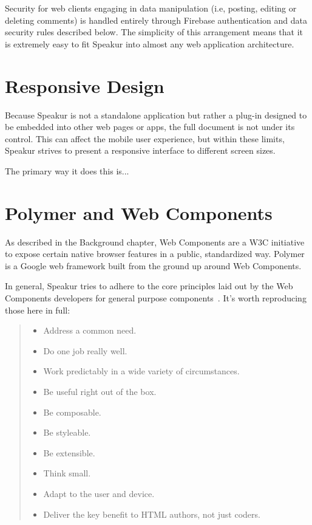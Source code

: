 Security for web clients engaging in data manipulation (i.e, posting, editing or deleting comments) is handled entirely through Firebase authentication and data security rules described below.
The simplicity of this arrangement means that it is extremely easy to fit Speakur into almost any web application architecture.

\section{Responsive Design}
Because Speakur is not a standalone application but rather a plug-in designed to be embedded into other web pages or apps, 
the full document is not under its control.
This can affect the mobile user experience,
but within these limits, Speakur strives to present a responsive interface to different screen sizes.

The primary way it does this is...

\section{Polymer and Web Components}
As described in the Background chapter, Web Components are a W3C initiative to expose certain native browser features in a public, standardized way. 
Polymer is a Google web framework built from the ground up around Web Components.

In general, Speakur tries to adhere to the core principles laid out by the 
Web Components developers 
for general purpose components~\cite{webcomponentscontributors2014}. 
It's worth reproducing those here in full:
\begin{quote}
\begin{itemize}
\item Address a common need.
\item Do one job really well.
\item Work predictably in a wide variety of circumstances.
\item Be useful right out of the box.
\item Be composable.
\item Be styleable.
\item Be extensible.
\item Think small.
\item Adapt to the user and device.
\item Deliver the key benefit to HTML authors, not just coders.
\end{itemize}
\end{quote}

